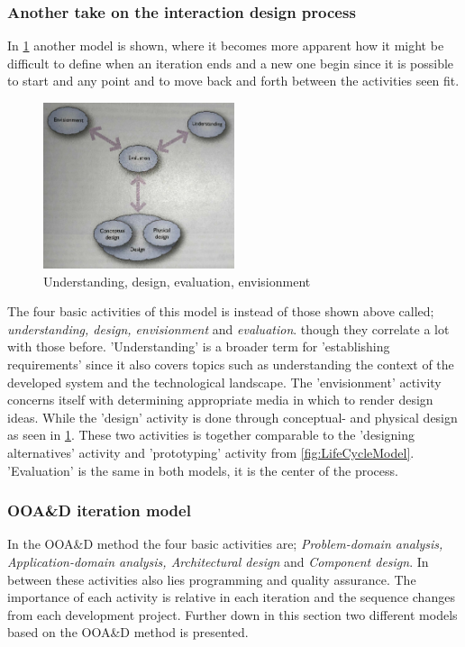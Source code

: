 \subsubsection{Another take on the interaction design process}\label{sec:Iterativedesign2}
In \cref{fig:DEBModel} another model is shown, where it becomes more apparent how it might be difficult to define when an iteration ends and a new one begin since it is possible to start and any point and to move back and forth between the activities seen fit.

\begin{figure}[H]
	\centering
	\includegraphics[width=0.5\textwidth]{billeder/DEBModel.png}
	\caption{Understanding, design, evaluation, envisionment \citep[p.~49]{Benyon}}\label{fig:DEBModel}
\end{figure}

The four basic activities of this model is instead of those shown above called; \textit{understanding, design, envisionment} and \textit{evaluation}.
though they correlate a lot with those before. 
'Understanding' is a broader term for 'establishing requirements' since it also covers topics such as understanding the context of the developed system and the technological landscape.
The 'envisionment' activity concerns itself with determining appropriate media in which to render design ideas.
While the 'design' activity is done through conceptual- and physical design as seen in \cref{fig:DEBModel}.
These two activities is together comparable to the 'designing alternatives' activity and 'prototyping' activity from \cref{fig:LifeCycleModel}.
'Evaluation' is the same in both models, it is the center of the process.

\subsubsection{OOA\&D iteration model}\label{sec:Iterative2}
In the OOA\&D method the four basic activities are; \textit{Problem-domain analysis, Application-domain analysis, Architectural design} and \textit{Component design}.
In between these activities  also lies programming and quality assurance.
The importance of each activity is relative in each iteration and the sequence changes from each development project.
Further down in this section two different models based on the OOA\&D method is presented.


